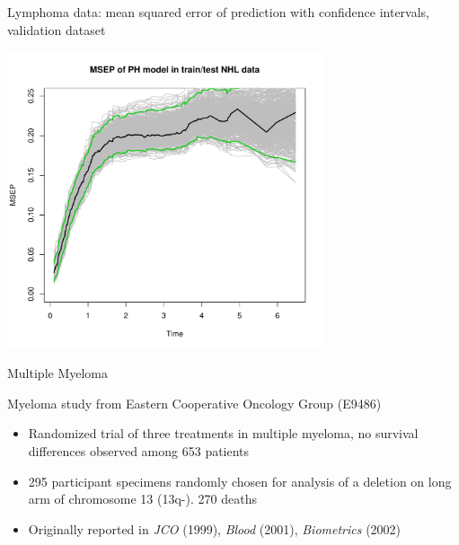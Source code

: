 \documentclass[11pt]{beamer}
\begin{document}
\begin{frame}{Lymphoma data: mean squared error of prediction with
confidence intervals, validation dataset}

\begin{center}
\includegraphics[width=0.7\textwidth]{./figures/NHLMSEPvalidationCI.pdf}
\end{center}

\end{frame}

\begin{frame}{Multiple Myeloma}

Myeloma study from Eastern Cooperative Oncology Group (E9486)


\begin{itemize}

\item Randomized trial of three treatments in multiple myeloma, no
survival differences observed among 653 patients

\vspace{.5em}

\item 295 participant specimens randomly chosen for analysis of a deletion
on long arm of chromosome 13 (13q-). 270 deaths


   \item Originally reported in {\sl JCO} (1999), {\sl Blood} (2001),
    {\sl Biometrics} (2002)

\end{itemize}

\end{frame}
\end{document}
